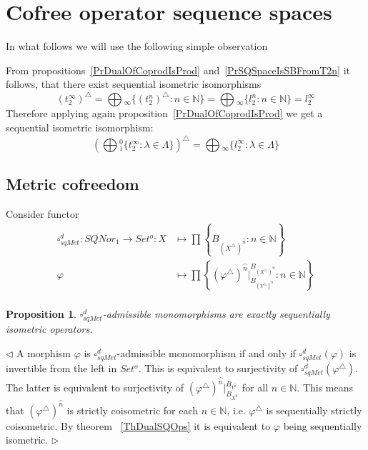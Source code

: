 \documentclass[12pt]{article}
\newtheorem{proposition}[theorem]{Proposition}
\newenvironment{proof}{\par $\triangleleft$}{$\triangleright$}
\begin{document}
\section{Cofree operator sequence spaces}

In what follows we will use the following simple observation 

From propositions~\ref{PrDualOfCoprodIsProd} 
and~\ref{PrSQSpaceIsSBFromT2n} it follows, that there exist 
sequential isometric isomorphisms
$$
{(t_2^\infty)}^\triangle =\bigoplus{}_\infty \{
    {(t_2^n)}^\triangle:n\in\mathbb{N} 
\}
=\bigoplus{}_\infty \{l_2^n:n\in\mathbb{N} \} =l_2^\infty
$$
Therefore applying again proposition~\ref{PrDualOfCoprodIsProd} we get a 
sequential isometric isomorphism:
$$
{\left(\bigoplus{}_1^0 \{t_2^\infty:\lambda\in\Lambda \}\right)}^\triangle
=\bigoplus{}_\infty \{l_2^\infty:\lambda\in\Lambda \}
$$
 
\subsection{Metric cofreedom}

Consider functor
$$
\begin{aligned}
\square_{sqMet}^d 
: SQNor_1 \to Set^o
: X &\mapsto \prod \left \{
    B_{{(X^\triangle)}^{\wideparen{n}}}
    :n\in\mathbb{N}\right \} \\
\varphi&\mapsto\prod\left \{ 
    {(\varphi^\triangle)}^{\wideparen{n}}|_{
        B_{{(Y^\triangle )}^{\wideparen{n}}}
    }^{
        B_{{(X^\triangle)}^{\wideparen{n}}}
    }
    :n\in\mathbb{N}\right \} \\
\end{aligned}
$$
\begin{proposition}\label{PrDecsMetrAdmMonoMorph}
$\square_{sqMet}^d$-admissible monomorphisms are exactly 
sequentially isometric operators.
\end{proposition}
\begin{proof}
A morphism $\varphi$ is $\square_{sqMet}^d$-admissible monomorphism 
if and only if $\square_{sqMet}^d(\varphi)$ is invertible from the 
left in $Set^o$. This is equivalent to surjectivity of 
$\square_{sqMet}^d(\varphi^\triangle)$. The latter is equivalent to 
surjectivity of 
${(\varphi^\triangle)}^{\wideparen{n}}
|_{B_{X^{\wideparen{n}}}}^{B_{Y^{\wideparen{n}}}}$ 
for all $n\in\mathbb{N}$. This means that 
${(\varphi^\triangle)}^{\wideparen{n}}$ 
is strictly coisometric for each $n\in\mathbb{N}$, i.e. $\varphi^\triangle$ is 
sequentially strictly coisometric. By theorem 
~\ref{ThDualSQOps} it is equivalent to $\varphi$ being sequentially isometric.
\end{proof}
\end{document}
